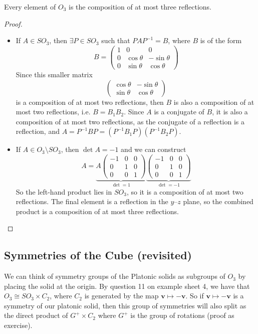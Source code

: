 \documentclass{article}
\begin{document}
\begin{corollary}
	Every element of $O_3$ is the composition of at most three reflections.
\end{corollary}
\begin{proof}
	\begin{itemize}
		\item If $A \in SO_3$, then $\exists P \in SO_3$ such that $PAP^{-1} = B$, where $B$ is of the form
		      \[ B = \begin{pmatrix}
				      1 & 0           & 0            \\
				      0 & \cos \theta & -\sin \theta \\
				      0 & \sin \theta & \cos \theta
			      \end{pmatrix} \]
		      Since this smaller matrix
		      \[ \begin{pmatrix}
				      \cos \theta & -\sin \theta \\
				      \sin \theta & \cos \theta
			      \end{pmatrix} \]
		      is a composition of at most two reflections, then $B$ is also a composition of at most two reflections, i.e. $B = B_1 B_2$. Since $A$ is a conjugate of $B$, it is also a composition of at most two reflections, as the conjugate of a reflection is a reflection, and $A = P^{-1}BP = (P^{-1}B_1P)(P^{-1}B_2P)$.
		\item If $A \in O_3 \setminus SO_3$, then $\det A = -1$ and we can construct
		      \[ A = \underbrace{A\begin{pmatrix}
					      -1 & 0 & 0 \\
					      0  & 1 & 0 \\
					      0  & 0 & 1
				      \end{pmatrix}}_{\det = 1}\underbrace{\begin{pmatrix}
					      -1 & 0 & 0 \\
					      0  & 1 & 0 \\
					      0  & 0 & 1
				      \end{pmatrix}}_{\det = -1} \]
		      So the left-hand product lies in $SO_3$, so it is a composition of at most two reflections. The final element is a reflection in the $y$--$z$ plane, so the combined product is a composition of at most three reflections.
	\end{itemize}
\end{proof}

\subsection{Symmetries of the Cube (revisited)}
We can think of symmetry groups of the Platonic solids as subgroups of $O_3$ by placing the solid at the origin. By question 11 on example sheet 4, we have that $O_3 \cong SO_3 \times C_2$, where $C_2$ is generated by the map $\bm v \mapsto -\bm v$. So if $\bm v\mapsto -\bm v$ is a symmetry of our platonic solid, then this group of symmetries will also split as the direct product of $G^+ \times C_2$ where $G^+$ is the group of rotations (proof as exercise).
\end{document}
